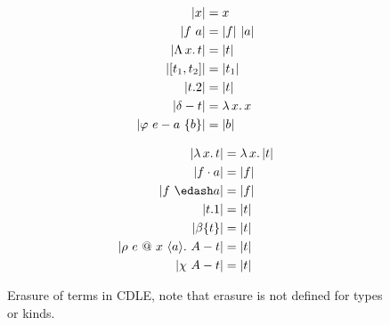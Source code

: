 

\begin{figure}
    \centering
    \begin{minipage}{0.5\textwidth}
        \begin{align*}
            |x| &= x \\
            |f\ a| &= |f|\ |a| \\
            |{\Lambda}\, x.\, t| &= |t| \\
            |[t_1, t_2]| &= |t_1| \\
            |t.2| &= |t| \\
            |\delta - t| &= {\lambda}\, x.\, x \\
            |\varphi\ e - a\ \{ b \}| &= |b|
        \end{align*}
    \end{minipage}%
    \begin{minipage}{0.5\textwidth}
        \begin{align*}
            |\absu{\lambda}{x}{t}| &= \absu{\lambda}{x}{|t|} \\
            |f \cdot a| &= |f| \\
            |f\ \edash a| &= |f| \\
            |t.1| &= |t| \\
            |\beta \{ t \}| &= |t| \\
            |\rho\ e\ @\ x\ \langle a \rangle.\ A - t| &= |t| \\
            |\chi\ A - t| &= |t|
        \end{align*}
    \end{minipage}%
    \caption{
        Erasure of terms in CDLE, note that erasure is not defined for types or kinds.
    }
    \label{fig:4:erasure}
\end{figure}